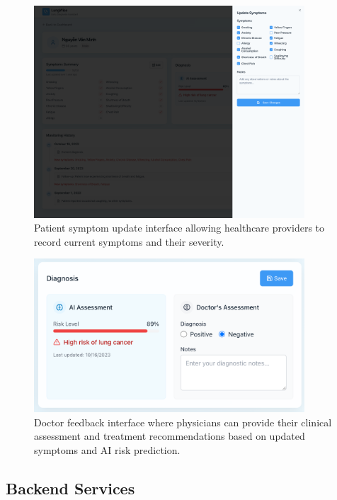 \begin{figure}[h]
    \centering
    \includegraphics[width=0.9\textwidth]{Images/patient_update_symptoms.png}
    \caption{Patient symptom update interface allowing healthcare providers to record current symptoms and their severity.}
    \label{fig:symptom_update}
\end{figure}

\begin{figure}[h]
    \centering
    \includegraphics[width=0.9\textwidth]{Images/doctor_feedback_box.png}
    \caption{Doctor feedback interface where physicians can provide their clinical assessment and treatment recommendations based on updated symptoms and AI risk prediction.}
    \label{fig:doctor_feedback}
\end{figure}

\subsection{Backend Services}

